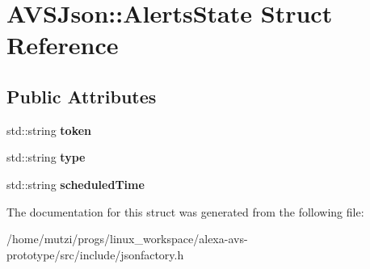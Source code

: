 \hypertarget{structAVSJson_1_1AlertsState}{}\section{A\+V\+S\+Json\+:\+:Alerts\+State Struct Reference}
\label{structAVSJson_1_1AlertsState}
\subsection*{Public Attributes}
\begin{DoxyCompactItemize}
\item 
\mbox{\label{structAVSJson_1_1AlertsState_a244089d06e6637d714a3d424c2a03b0d}} 
std\+::string {\bfseries token}
\item 
\mbox{\label{structAVSJson_1_1AlertsState_a2a03bcc7f65dbbea1f7a72f16ef97e41}} 
std\+::string {\bfseries type}
\item 
\mbox{\label{structAVSJson_1_1AlertsState_a25faf7a58b1f312cf1a4cbc4993ff042}} 
std\+::string {\bfseries scheduled\+Time}
\end{DoxyCompactItemize}


The documentation for this struct was generated from the following file\+:\begin{DoxyCompactItemize}
\item 
/home/mutzi/progs/linux\+\_\+workspace/alexa-\/avs-\/prototype/src/include/jsonfactory.\+h\end{DoxyCompactItemize}
